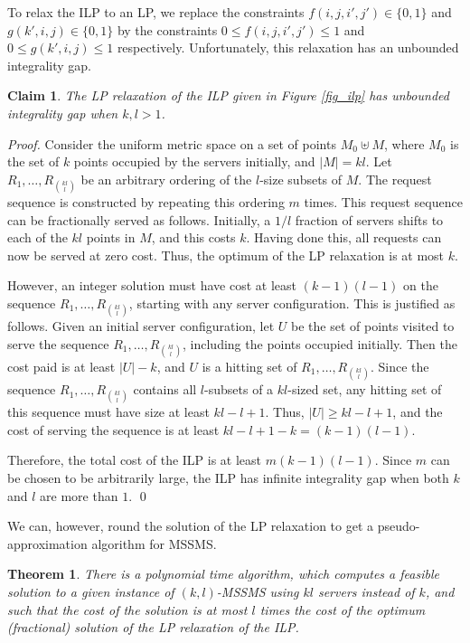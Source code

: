 \documentclass[11pt]{article}
\theoremstyle{plain}\newtheorem{theorem}{Theorem}
\newtheorem{claim}{Claim}
\theoremstyle{definition}
\theoremstyle{remark}
\begin{document}
To relax the ILP to an LP, we replace the constraints $f(i,j,i',j')\in\{0,1\}$ and $g(k',i,j)\in\{0,1\}$ by the constraints $0\leq f(i,j,i',j')\leq1$ and $0\leq g(k',i,j)\leq1$ respectively. Unfortunately, this relaxation has an unbounded integrality gap.

\begin{claim}
The LP relaxation of the ILP given in Figure \ref{fig_ilp} has unbounded integrality gap when $k,l>1$.
\end{claim}

\begin{proof}
Consider the uniform metric space on a set of points $M_0\uplus M$, where $M_0$ is the set of $k$ points occupied by the servers initially, and $|M|=kl$.
Let $R_1,\ldots,R_{{kl}\choose{l}}$ be an arbitrary ordering of the $l$-size subsets of $M$. The request sequence is constructed by repeating this ordering $m$ times. This request sequence can be fractionally served as follows. Initially, a $1/l$ fraction of servers shifts to each of the $kl$ points in $M$, and this costs $k$. Having done this, all requests can now be served at zero cost. Thus, the optimum of the LP relaxation is at most $k$. 

However, an integer solution must have cost at least $(k-1)(l-1)$ on the sequence $R_1,\ldots,R_{{kl}\choose{l}}$, starting with any server configuration. This is justified as follows. 
Given an initial server configuration, let $U$ be the set of points visited to serve the sequence $R_1,\ldots,R_{{kl}\choose{l}}$, including the points occupied initially. Then the cost paid is at least $|U|-k$, and $U$ is a hitting set of $R_1,\ldots,R_{{kl}\choose{l}}$. Since the sequence $R_1,\ldots,R_{{kl}\choose{l}}$ contains all $l$-subsets of a $kl$-sized set, any hitting set of this sequence must have size at least $kl-l+1$. Thus, $|U|\geq kl-l+1$, and the cost of serving the sequence is at least $kl-l+1-k=(k-1)(l-1)$.

Therefore, the total cost of the ILP is at least $m(k-1)(l-1)$. Since $m$ can be chosen to be arbitrarily large, the ILP has infinite integrality gap when both $k$ and $l$ are more than $1$. \qed
\end{proof}

We can, however, round the solution of the LP relaxation to get a pseudo-approximation algorithm for MSSMS.

\begin{theorem}
There is a polynomial time algorithm, which computes a feasible solution to a given instance of $(k,l)$-MSSMS using $kl$ servers instead of $k$, and such that the cost of the solution is at most $l$ times the cost of the optimum (fractional) solution of the LP relaxation of the ILP. \end{theorem}
\end{document}

